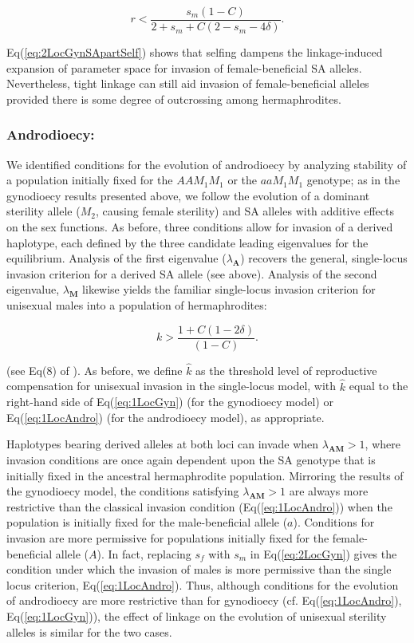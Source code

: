 \documentclass{article}
\begin{document}
\begin{equation}\label{eq:2LocGynSApartSelf}
	r < \frac{s_m (1 - C)}{2 + s_m +C (2 - s_m - 4 \delta)}.
\end{equation}

\noindent Eq(\ref{eq:2LocGynSApartSelf}) shows that selfing dampens the linkage-induced expansion of parameter space for invasion of female-beneficial SA alleles. Nevertheless, tight linkage can still aid invasion of female-beneficial alleles provided there is some degree of outcrossing among hermaphrodites. 


\subsubsection*{Androdioecy:} We identified conditions for the evolution of androdioecy by analyzing stability of a population initially fixed for the $AAM_1M_1$ or the $aaM_1M_1$ genotype; as in the gynodioecy results presented above, we follow the evolution of a dominant sterility allele ($M_2$, causing female sterility) and SA alleles with additive effects on the sex functions. As before, three conditions allow for invasion of a derived haplotype, each defined by the three candidate leading eigenvalues for the equilibrium. Analysis of the first eigenvalue ($\lambda_{\mathbf{A}}$) recovers the general, single-locus invasion criterion for a derived SA allele (see above). Analysis of the second eigenvalue, $\lambda_{\mathbf{M}}$ likewise yields the familiar single-locus invasion criterion for unisexual males into a population of hermaphrodites:

\begin{equation}\label{eq:1LocAndro}
	k > \frac{1 + C (1 - 2 \delta)}{(1 - C)}.
\end{equation}

\noindent (see Eq(8) of \citealt{Charlesworth1978a}). As before, we define $\hat{k}$ as the threshold level of reproductive compensation for unisexual invasion in the single-locus model, with $\hat{k}$ equal to the right-hand side of Eq(\ref{eq:1LocGyn}) (for the gynodioecy model) or Eq(\ref{eq:1LocAndro}) (for the androdioecy model), as appropriate.

Haplotypes bearing derived alleles at both loci can invade when $\lambda_{\mathbf{AM}} > 1$, where invasion conditions are once again dependent upon the SA genotype that is initially fixed in the ancestral hermaphrodite population. Mirroring the results of the gynodioecy model, the conditions satisfying $\lambda_{\mathbf{AM}} > 1$ are always more restrictive than the classical invasion condition (Eq(\ref{eq:1LocAndro})) when the population is initially fixed for the male-beneficial allele ($a$). Conditions for invasion are more permissive for populations initially fixed for the female-beneficial allele ($A$). In fact, replacing $s_f$ with $s_m$ in Eq(\ref{eq:2LocGyn}) gives the condition under which the invasion of males is more permissive than the single locus criterion, Eq(\ref{eq:1LocAndro}). Thus, although conditions for the evolution of androdioecy are more restrictive than for gynodioecy (cf. Eq(\ref{eq:1LocAndro}), Eq(\ref{eq:1LocGyn})), the effect of linkage on the evolution of unisexual sterility alleles is similar for the two cases. 
\end{document}
